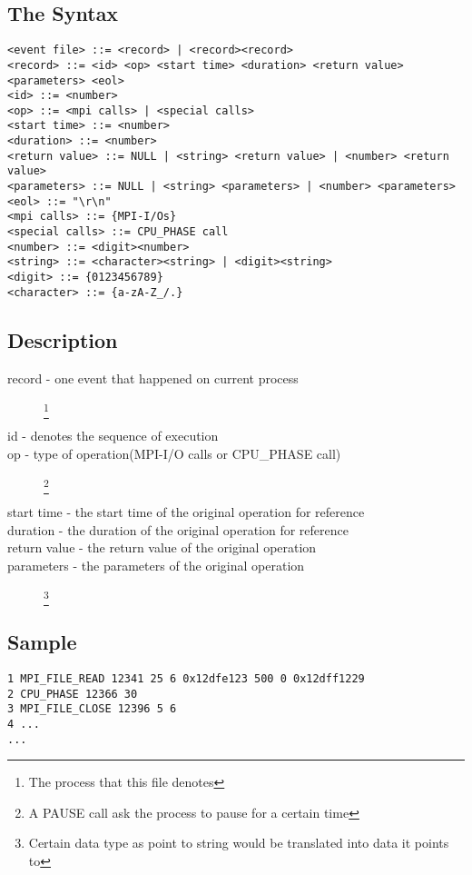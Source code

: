 \documentclass[9pt]{article}
\begin{document}
\subsection{The Syntax}
\label{sec:TheSyntax}
\begin{verbatim}
<event file> ::= <record> | <record><record>
<record> ::= <id> <op> <start time> <duration> <return value> <parameters> <eol>
<id> ::= <number>
<op> ::= <mpi calls> | <special calls>
<start time> ::= <number>
<duration> ::= <number>
<return value> ::= NULL | <string> <return value> | <number> <return value>
<parameters> ::= NULL | <string> <parameters> | <number> <parameters>
<eol> ::= "\r\n"
<mpi calls> ::= {MPI-I/Os}
<special calls> ::= CPU_PHASE call
<number> ::= <digit><number>
<string> ::= <character><string> | <digit><string>
<digit> ::= {0123456789}
<character> ::= {a-zA-Z_/.}
\end{verbatim}

\subsection{Description}
\label{sec:Description}
\begin{description}
	\item[record - one event that happened on current process]\footnote{The process that this file denotes}
	\item[id - denotes the sequence of execution]
	\item[op - type of operation(MPI-I/O calls or CPU\_PHASE call)]\footnote{A PAUSE call ask the process to pause for a certain time}
	\item[start time - the start time of the original operation for reference]
	\item[duration - the duration of the original operation for reference]
        \item[return value - the return value of the original operation]
	\item[parameters - the parameters of the original operation]\footnote{Certain data type as point to string would be translated into data it points to}
\end{description}

\subsection{Sample}
\label{sec:SampleMPI}
\begin{verbatim}
1 MPI_FILE_READ 12341 25 6 0x12dfe123 500 0 0x12dff1229
2 CPU_PHASE 12366 30
3 MPI_FILE_CLOSE 12396 5 6
4 ...
...
\end{verbatim}
\end{document}
